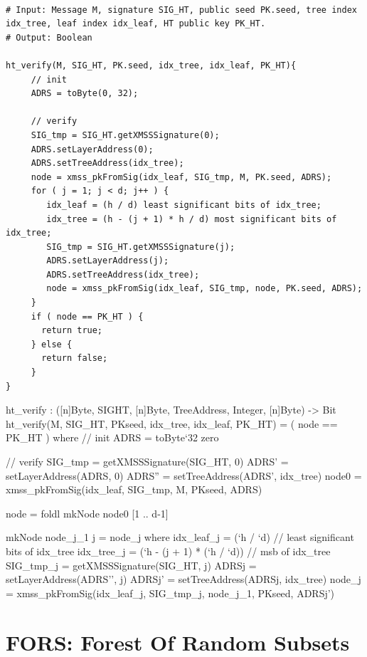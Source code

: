 \begin{lstlisting}[breaklines=true, label=alg:ht:ver, mathescape, language=pseudoc,
                   caption=\htverify\ -- Verifying a \hyper signature \htsig on a
   message \msg using a \hyper public key \htpk]
   
# Input: Message M, signature SIG_HT, public seed PK.seed, tree index idx_tree, leaf index idx_leaf, HT public key PK_HT.
# Output: Boolean

ht_verify(M, SIG_HT, PK.seed, idx_tree, idx_leaf, PK_HT){
     // init
     ADRS = toByte(0, 32);

     // verify
     SIG_tmp = SIG_HT.getXMSSSignature(0);
     ADRS.setLayerAddress(0);
     ADRS.setTreeAddress(idx_tree);
     node = xmss_pkFromSig(idx_leaf, SIG_tmp, M, PK.seed, ADRS);
     for ( j = 1; j < d; j++ ) {
        idx_leaf = (h / d) least significant bits of idx_tree;
        idx_tree = (h - (j + 1) * h / d) most significant bits of idx_tree;
        SIG_tmp = SIG_HT.getXMSSSignature(j);
        ADRS.setLayerAddress(j);
        ADRS.setTreeAddress(idx_tree);
        node = xmss_pkFromSig(idx_leaf, SIG_tmp, node, PK.seed, ADRS);
     }
     if ( node == PK_HT ) {
       return true;
     } else {
       return false;
     }
}
\end{lstlisting}

\begin{code}
  ht_verify : ([n]Byte, SIGHT, [n]Byte, TreeAddress, Integer, [n]Byte) -> Bit 
  ht_verify(M, SIG_HT, PKseed, idx_tree, idx_leaf, PK_HT) = ( node == PK_HT )
    where
    // init
    ADRS = toByte`{32} zero

    // verify
    SIG_tmp = getXMSSSignature(SIG_HT, 0)
    ADRS' = setLayerAddress(ADRS, 0)
    ADRS'' = setTreeAddress(ADRS', idx_tree)
    node0 = xmss_pkFromSig(idx_leaf, SIG_tmp, M, PKseed, ADRS)

    node = foldl mkNode node0 [1 .. d-1]

    mkNode node_j_1 j = node_j where
      idx_leaf_j = (`h / `d) // least significant bits of idx_tree
      idx_tree_j = (`h - (j + 1) * (`h / `d)) // msb of idx_tree
      SIG_tmp_j = getXMSSSignature(SIG_HT, j)
      ADRSj = setLayerAddress(ADRS'', j)
      ADRSj' = setTreeAddress(ADRSj, idx_tree)
      node_j = xmss_pkFromSig(idx_leaf_j, SIG_tmp_j, node_j_1, PKseed, ADRSj')
\end{code}

\section{FORS: Forest Of Random Subsets}

